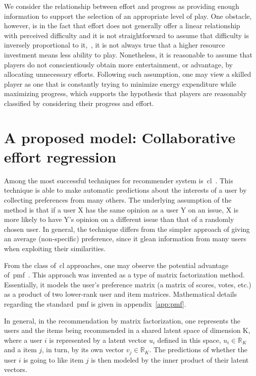 We consider the relationship between effort and progress as providing enough information to support the selection of an appropriate level of play. One obstacle, however, is in the fact that effort does not generally offer a linear relationship with perceived difficulty and it is not straightforward to assume that difficulty is inversely proportional to it,~\ie, it is not always true that a higher resource investment means less ability to play. 
Nonetheless, it is reasonable to assume that players do not conscientiously obtain more entertainment, or advantage, by allocating unnecessary efforts. Following such assumption, one may view a skilled player as one that is constantly trying to minimize energy expenditure while maximizing progress, which supports the hypothesis that players are reasonably classified by considering their progress and effort.

\section{A proposed model: Collaborative effort regression}

Among the most successful techniques for recommender system is~\gls{cl}~\citep{su_survey_2009, schafer_collaborative_2007}. %
This technique is able to make automatic predictions about the interests of a user by collecting preferences from many others. The underlying assumption of the method is that if a user X has the same opinion as a user Y on an issue, X is more likely to have Y's opinion on a different issue than that of a randomly chosen user. In general, the technique differs from the simpler approach of giving an average (non-specific) preference, since it glean information from many users when exploiting their similarities.

From the class of~\gls{cl} approaches, one may observe the potential advantage of~\gls{pmf}~\citep{mnih_probabilistic_2008}. This approach was invented as a type of matrix factorization method. Essentially, it models the user's preference matrix (a matrix of scores, votes, etc.) as a product of two lower-rank user and item matrices. Mathematical details regarding the standard~\gls{pmf} is given in appendix~\ref{app:pmf}. 

In general, in the recommendation by matrix factorization, one represents the users and the items being recommended in a shared latent space of dimension K, where a user $i$ is represented by a latent vector $u_{i}$ defined in this space, \ie $u_{i} \in \mathbb{R}_{K}$ and a item $j$, in turn, by its own vector $v_{j} \in \mathbb{R}_{K}$. The predictions of whether the user $i$ is going to like item $j$ is then modeled by the inner product of their latent vectors.

